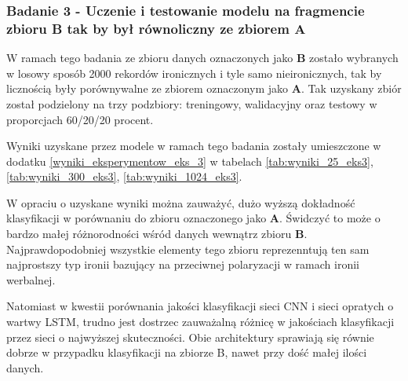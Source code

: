 \subsubsection{Badanie 3 - Uczenie i testowanie modelu na fragmencie zbioru B tak by był równoliczny ze zbiorem A}

W ramach tego badania ze zbioru danych oznaczonych jako \textbf{B} zostało wybranych w losowy sposób 2000 rekordów ironicznych i tyle samo nieironicznych, tak by licznością były porównywalne ze zbiorem oznaczonym jako \textbf{A}. Tak uzyskany zbiór został podzielony na trzy podzbiory: treningowy, walidacyjny oraz testowy w proporcjach 60/20/20 procent.

Wyniki uzyskane przez modele w ramach tego badania zostały umieszczone w dodatku \ref{wyniki_eksperymentow_eks_3} w tabelach \ref{tab:wyniki_25_eks3}, \ref{tab:wyniki_300_eks3}, \ref{tab:wyniki_1024_eks3}.



W opraciu o uzyskane wyniki można zauważyć, dużo wyższą dokładność klasyfikacji w porównaniu do zbioru oznaczonego jako \textbf{A}. Świdczyć to może o bardzo małej różnorodności wśród danych wewnątrz zbioru \textbf{B}. Najprawdopodobniej wszystkie elementy tego zbioru reprezenntują ten sam najprostszy typ ironii bazujący na przeciwnej polaryzacji w ramach ironii werbalnej.

Natomiast w kwestii porównania jakości klasyfikacji sieci CNN i sieci  opratych o wartwy LSTM, trudno jest dostrzec zauważalną różnicę w jakościach klasyfikacji przez sieci o najwyższej skuteczności. Obie architektury sprawiają się równie dobrze w przypadku klasyfikacji na zbiorze B, nawet przy dość małej ilości danych.





